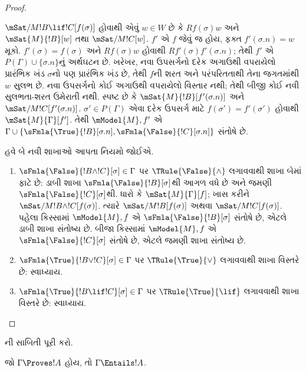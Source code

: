 \documentclass[../../../include/open-logic-section]{subfiles}
\begin{document}
\begin{proof}
\begin{enumerate}
  $\mSat/{M}{!B \lif !C}[f(\sigma)]$
  હોવાથી એવું $w \in W$ છે કે $Rf(\sigma)w$
  અને $\mSat{M}{!B}[w]$ તથા
  $\mSat/{M}{!C}[w]$. $f'$ એ $f$ જેવું જ હોય,
  ફક્ત $f'(\sigma.n) = w$ મૂકો.
  $f'(\sigma) = f(\sigma)$ અને $Rf(\sigma)w$
  હોવાથી $Rf'(\sigma)f'(\sigma.n)$; તેથી
  $f'$ એ $P(\Gamma) \cup \{\sigma.n\}$નું
  અર્થઘટન છે. ખરેખર, નવા ઉપસર્ગનો દરેક અગાઉથી
  વપરાયેલો પ્રારંભિક ખંડ $\sigma$નો પણ પ્રારંભિક
  ખંડ છે, તેથી $f$ની શરત અને પરંપરિતતાથી તેના
  જગતમાંથી $w$ સુલભ છે. નવા ઉપસર્ગનો કોઈ અગાઉથી
  વપરાયેલો વિસ્તાર નથી; તેથી બીજી કોઈ નવી
  સુલભતા-શરત ઉમેરાતી નથી. સ્પષ્ટ છે કે
  $\mSat{M}{!B}[f'(\sigma.n)]$ અને
  $\mSat/{M}{!C}[f'(\sigma.n)]$.
  $\sigma' \in P(\Gamma)$ એવા દરેક ઉપસર્ગ માટે
  $f(\sigma') = f'(\sigma')$ હોવાથી
  $\mSat{M}{\Gamma}[f']$. તેથી $\mModel{M}, f'$
  એ $\Gamma \cup \{\sFmla{\True}{!B}[\sigma.n],
  \sFmla{\False}{!C}[\sigma.n]\}$ સંતોષે છે.
\end{enumerate}
હવે બે નવી શાખાઓ આપતા નિયમો જોઈએ.
\begin{enumerate}
\item $\sFmla{\False}{!B \land !C}[\sigma] \in \Gamma$
  પર $\TRule{\False}{\land}$ લગાવવાથી
  શાખા બેમાં ફાટે છે: ડાબી શાખા
  $\sFmla{\False}{!B}[\sigma]$થી આગળ વધે છે
  અને જમણી $\sFmla{\False}{!C}[\sigma]$થી.
  ધારો કે $\mSat{M}{\Gamma}[f]$; ખાસ કરીને
  $\mSat/{M}{!B \land !C}[f(\sigma)]$.
  ત્યારે $\mSat/{M}{!B}[f(\sigma)]$ અથવા
  $\mSat/{M}{!C}[f(\sigma)]$. પહેલા કિસ્સામાં
  $\mModel{M}, f$ એ $\sFmla{\False}{!B}[\sigma]$
  સંતોષે છે, એટલે ડાબી શાખા સંતોષ્ય છે.
  બીજા કિસ્સામાં $\mModel{M}, f$ એ
  $\sFmla{\False}{!C}[\sigma]$ સંતોષે છે,
  એટલે જમણી શાખા સંતોષ્ય છે.
\item $\sFmla{\True}{!B \lor !C}[\sigma] \in \Gamma$
  પર $\TRule{\True}{\lor}$ લગાવવાથી શાખા
  વિસ્તરે છે: સ્વાધ્યાય.
\item $\sFmla{\True}{!B \lif !C}[\sigma] \in \Gamma$
  પર $\TRule{\True}{\lif}$ લગાવવાથી શાખા
  વિસ્તરે છે: સ્વાધ્યાય.
\end{enumerate}
\end{proof}

\begin{prob}
ની
સાબિતી પૂરી કરો.
\end{prob}

\begin{cor}
જો $\Gamma \Proves !A$ હોય, તો
$\Gamma \Entails !A$.
\end{cor}
\end{document}
